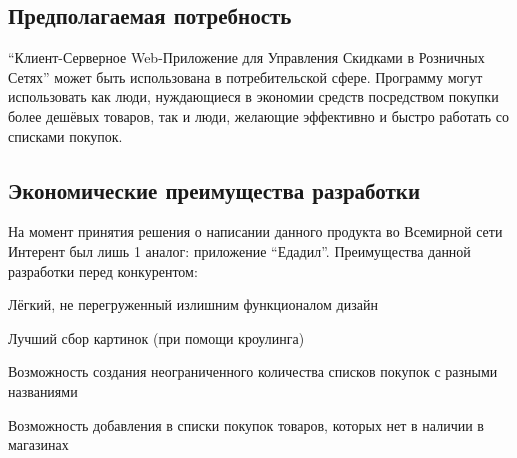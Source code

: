 \subsection{Предполагаемая потребность} ``Клиент-Серверное Web-Приложение
для Управления Скидками в Розничных Сетях'' может быть использована в
потребительской сфере. Программу могут использовать как люди, нуждающиеся в
экономии средств посредством покупки более дешёвых товаров, так и люди,
желающие эффективно и быстро работать со списками покупок.

\subsection{Экономические преимущества разработки} На момент принятия решения о
написании данного продукта во Всемирной сети Интерент был лишь 1 аналог:
приложение ``Едадил''.  Преимущества данной разработки перед конкурентом:
\begin{my_enumerate}
\item Лёгкий, не перегруженный излишним функционалом дизайн
\item Лучший сбор картинок (при помощи кроулинга)
\item Возможность создания неограниченного количества списков покупок с разными названиями
\item Возможность добавления в списки покупок товаров, которых нет в наличии в магазинах
\end{my_enumerate}
